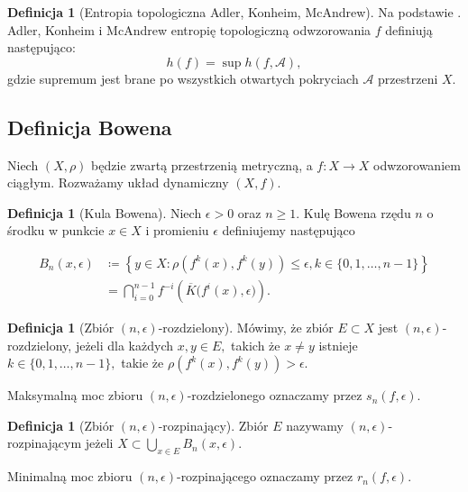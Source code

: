 \documentclass[licencjacka]{pwr_wmat_praca_dyplomowa}
\theoremstyle{plain}
\numberwithin{theorem}{chapter}
\theoremstyle{definition}
\numberwithin{theorem}{chapter}
\newtheorem{definition}[theorem]{Definicja}
\begin{document}
\begin{definition}[Entropia topologiczna Adler, Konheim, McAndrew]
\label{definicja_entropii_topologicznej_adlera}
Na podstawie \cite{misiurewicz1993}.
Adler, Konheim i McAndrew entropię topologiczną odwzorowania $f$ definiują następująco: 
$$h(f) = \sup h(f, \mathcal{A}),$$ gdzie supremum jest brane po wszystkich otwartych pokryciach $\mathcal{A}$ przestrzeni $X$.
\end{definition}


\subsection{Definicja Bowena}

Niech $(X, \rho)$ będzie zwartą przestrzenią metryczną, a $f: X \rightarrow X$ odwzorowaniem ciągłym. Rozważamy układ dynamiczny $(X, f).$

\begin{definition}[Kula Bowena]
\cite[s.~58]{ruette2017chaos}
Niech  $\epsilon > 0$ oraz $n \geq 1$. Kulę Bowena rzędu $n$ o środku w punkcie $x \in X$ i promieniu $\epsilon$ definiujemy następująco

\begin{equation}
\begin{aligned}
B_n(x,\epsilon) & \coloneqq \left\{y \in X : \rho\left(f^k(x), f^k(y)\right) \leq \epsilon, k \in \{0, 1, \ldots, n-1\}\right\} \\
& = \bigcap_{i=0}^{n-1}f^{-i}\left(\overline{K}\big(f^i(x), \epsilon\big)\right).
\end{aligned}
\end{equation}

\end{definition} 


\begin{definition}[Zbiór $(n,\epsilon)$-rozdzielony]
\label{definicja_n_eps_rozdzielonego}
\cite[s.~58]{ruette2017chaos}
Mówimy, że zbiór $E \subset X$ jest $(n, \epsilon)$-rozdzielony, jeżeli dla każdych $x, y \in E,$ takich że $x \neq y$ istnieje $k \in \{0, 1, \ldots, n-1\},$ takie że $\rho\left(f^k(x), f^k(y)\right) > \epsilon.$

Maksymalną moc zbioru $(n, \epsilon)$-rozdzielonego oznaczamy przez $s_n(f, \epsilon).$
\end{definition}


\begin{definition}[Zbiór $(n, \epsilon)$-rozpinający]
\cite[s.~58]{ruette2017chaos}
Zbiór $E$ nazywamy $(n,\epsilon)$-rozpinającym jeżeli $X \subset \bigcup_{x \in E}B_n(x, \epsilon)$.

Minimalną moc zbioru $(n, \epsilon)$-rozpinającego oznaczamy przez $r_n(f, \epsilon).$

\end{definition}
\end{document}
